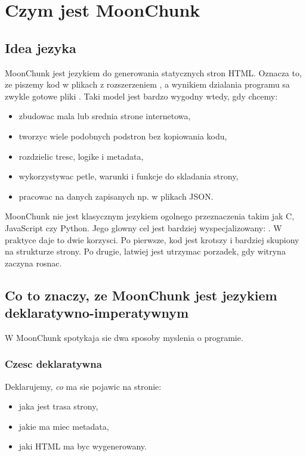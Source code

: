\chapter{Czym jest MoonChunk}

\section{Idea jezyka}
MoonChunk jest jezykiem do generowania statycznych stron HTML. Oznacza to, ze
piszemy kod w plikach z rozszerzeniem , a wynikiem dzialania programu
sa zwykle gotowe pliki . Taki model jest bardzo wygodny wtedy, gdy chcemy:

\begin{itemize}
  \item zbudowac mala lub srednia strone internetowa,
  \item tworzyc wiele podobnych podstron bez kopiowania kodu,
  \item rozdzielic tresc, logike i metadata,
  \item wykorzystywac petle, warunki i funkcje do skladania strony,
  \item pracowac na danych zapisanych np. w plikach JSON.
\end{itemize}

MoonChunk nie jest klasycznym jezykiem ogolnego przeznaczenia takim jak C,
JavaScript czy Python. Jego glowny cel jest bardziej wyspecjalizowany:
. W praktyce daje to dwie
korzysci. Po pierwsze, kod jest krotszy i bardziej skupiony na strukturze strony.
Po drugie, latwiej jest utrzymac porzadek, gdy witryna zaczyna rosnac.

\section{Co to znaczy, ze MoonChunk jest jezykiem deklaratywno-imperatywnym}
W MoonChunk spotykaja sie dwa sposoby myslenia o programie.

\subsection*{Czesc deklaratywna}
Deklarujemy, \emph{co} ma sie pojawic na stronie:

\begin{itemize}
  \item jaka jest trasa strony,
  \item jakie ma miec metadata,
  \item jaki HTML ma byc wygenerowany.
\end{itemize}

